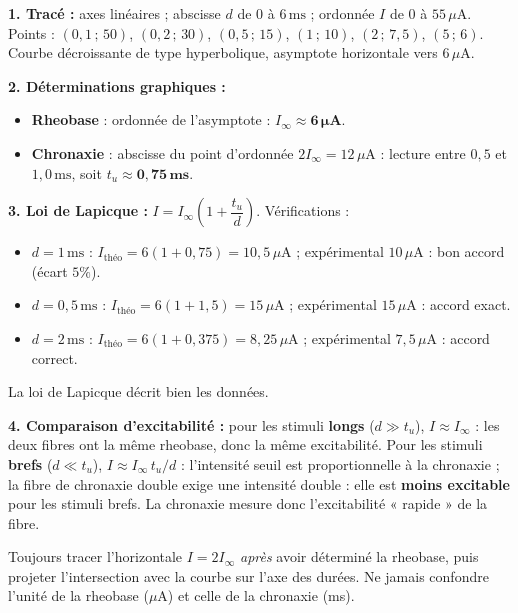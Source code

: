 \documentclass[11pt]{article}
\begin{document}
\begin{corrige}
\textbf{1. Tracé :} axes linéaires ; abscisse $d$ de 0 à $6\,\text{ms}$ ; ordonnée $I$ de 0 à $55\,\mu\text{A}$. Points : $(0{,}1\,;\,50)$, $(0{,}2\,;\,30)$, $(0{,}5\,;\,15)$, $(1\,;\,10)$, $(2\,;\,7{,}5)$, $(5\,;\,6)$. Courbe décroissante de type hyperbolique, asymptote horizontale vers $6\,\mu\text{A}$.

\textbf{2. Déterminations graphiques :}
\begin{itemize}
\item \textbf{Rheobase} : ordonnée de l'asymptote : $I_{\infty} \approx \mathbf{6\,\mu\text{A}}$.
\item \textbf{Chronaxie} : abscisse du point d'ordonnée $2 I_{\infty} = 12\,\mu\text{A}$ : lecture entre $0{,}5$ et $1{,}0\,\text{ms}$, soit $t_u \approx \mathbf{0{,}75\,\text{ms}}$.
\end{itemize}

\textbf{3. Loi de Lapicque :} $I = I_{\infty}\left(1 + \dfrac{t_u}{d}\right)$.
Vérifications :
\begin{itemize}
\item $d = 1\,\text{ms}$ : $I_{\text{théo}} = 6(1 + 0{,}75) = 10{,}5\,\mu\text{A}$ ; expérimental $10\,\mu\text{A}$ : bon accord (écart $5\%$).
\item $d = 0{,}5\,\text{ms}$ : $I_{\text{théo}} = 6(1 + 1{,}5) = 15\,\mu\text{A}$ ; expérimental $15\,\mu\text{A}$ : accord exact.
\item $d = 2\,\text{ms}$ : $I_{\text{théo}} = 6(1 + 0{,}375) = 8{,}25\,\mu\text{A}$ ; expérimental $7{,}5\,\mu\text{A}$ : accord correct.
\end{itemize}
La loi de Lapicque décrit bien les données.

\textbf{4. Comparaison d'excitabilité :} pour les stimuli \textbf{longs} ($d \gg t_u$), $I \approx I_{\infty}$ : les deux fibres ont la même rheobase, donc la même excitabilité. Pour les stimuli \textbf{brefs} ($d \ll t_u$), $I \approx I_{\infty}\, t_u / d$ : l'intensité seuil est proportionnelle à la chronaxie ; la fibre de chronaxie double exige une intensité double : elle est \textbf{moins excitable} pour les stimuli brefs. La chronaxie mesure donc l'excitabilité « rapide » de la fibre.

\begin{methode}
Toujours tracer l'horizontale $I = 2 I_{\infty}$ \emph{après} avoir déterminé la rheobase, puis projeter l'intersection avec la courbe sur l'axe des durées. Ne jamais confondre l'unité de la rheobase ($\mu\text{A}$) et celle de la chronaxie (ms).
\end{methode}
\end{corrige}
\end{document}
